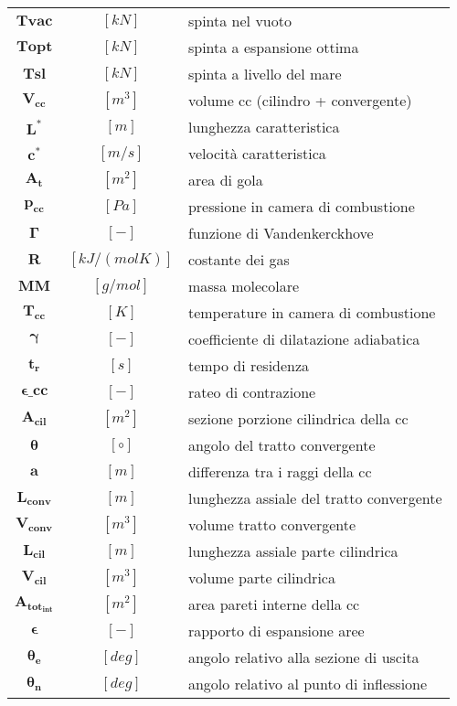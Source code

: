 \begin{multicols}{2}
{\begin{xltabular}{\linewidth}{cc>{\raggedright\arraybackslash}X}
		$\bm{T{vac}}$ & $[kN]$ & spinta nel vuoto \\
		$\bm{T{opt}}$ & $[kN]$ & spinta a espansione ottima \\
		$\bm{T{sl}}$ & $[kN]$ & spinta a livello del mare \\
		$\bm{V_{cc}  }$ & $[m^3]$ & volume cc (cilindro + convergente) \\
		$\bm{L^* }$ & $[m]$ & lunghezza caratteristica \\
		$\bm{c^* }$ & $[m/s]$ & velocità caratteristica \\
		$\bm{A_{t} }$ & $[m^2]$ & area di gola \\
	    $\bm{p_{cc} }$ & $[Pa]$ & pressione in camera di combustione \\
	    $\bm{\Gamma}$ & $[-]$ & funzione di Vandenkerckhove \\
		$\bm{R}$ & $[kJ/(molK)]$ & costante dei gas \\
	    $\bm{MM}$ & $[g/mol]$ & massa molecolare \\
	    $\bm{T_{cc} }$ & $[K]$ & temperature in camera di combustione \\
		$\bm{\gamma}$ & $[-]$ & coefficiente di dilatazione adiabatica \\
	    $\bm{t_{r} }$ & $[s]$ & tempo di residenza \\
	    $\bm{\epsilon\_{cc} }$ & $[-]$ & rateo di contrazione             \\
		$\bm{A_{cil} }$ & $[m^2]$ & sezione porzione cilindrica della cc \\
	    $\bm{\theta}$ & $[\circ]$ & angolo del tratto convergente   \\
	    $\bm{a}$ & $[m]$ & differenza tra i raggi della cc \\
		$\bm{L_{conv}}$ & $[m]$ & lunghezza assiale del tratto convergente \\
	    $\bm{V_{conv} }$ & $[m^3]$ & volume tratto convergente  \\
	    $\bm{L_{cil} }$ & $[m]$ & lunghezza assiale parte cilindrica \\
		$\bm{V_{cil} }$ & $[m^3]$ & volume parte cilindrica \\
	    $\bm{A_{tot_{int}}}$ & $[m^2]$ & area pareti interne della cc \\
		$\bm{\epsilon}$ & $[-]$ & rapporto di espansione aree \\
		$\bm{\theta_e}$ & $[deg]$ & angolo relativo alla sezione di uscita \\
		$\bm{\theta_n}$ & $[deg]$ & angolo relativo al punto di inflessione \\

\end{xltabular}}
\end{multicols}
